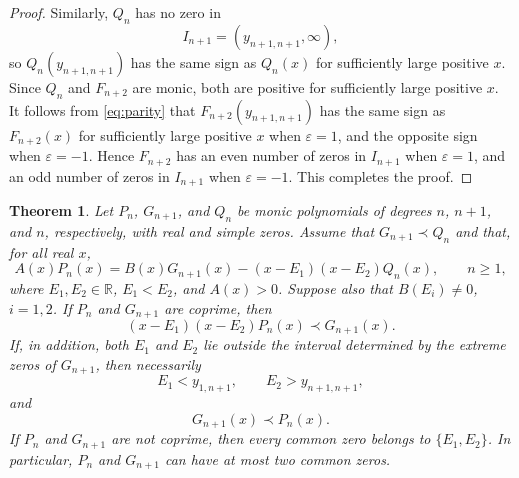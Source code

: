 \documentclass[final,3p,times,12pt]{elsarticle}
\newtheorem{theorem}{Theorem}[section]
\numberwithin{equation}{section}  %
\begin{document}
\begin{proof}
\medskip \noindent
Similarly, $Q_n$ has no zero in
\[
I_{n+1}=(y_{n+1,n+1},\infty),
\]
so $Q_n(y_{n+1,n+1})$ has the same sign as $Q_n(x)$ for sufficiently large positive $x$. Since $Q_n$ and $F_{n+2}$ are monic, both are positive for sufficiently large positive $x$. It follows from \eqref{eq:parity} that $F_{n+2}(y_{n+1,n+1})$ has the same sign as $F_{n+2}(x)$ for sufficiently large positive $x$ when $\varepsilon=1$, and the opposite sign when $\varepsilon=-1$. Hence $F_{n+2}$ has an even number of zeros in $I_{n+1}$ when $\varepsilon=1$, and an odd number of zeros in $I_{n+1}$ when $\varepsilon=-1$. This completes the proof.
\end{proof}





\begin{theorem}\label{MainTheorem3} Let $P_n$, $G_{n+1}$, and $Q_n$ be monic polynomials of degrees $n$, $n+1$, and $n$, respectively, with real and simple zeros. Assume that $G_{n+1}\prec Q_n$ and that, for all real $x$, \begin{equation} A(x)P_n(x) = B(x)G_{n+1}(x) - (x-E_1)(x-E_2)Q_n(x), \qquad n\geq1, \label{GeneralMixedTTRR3} \end{equation} where $E_1,E_2\in\mathbb{R}$, $E_1<E_2$, and $A(x)>0$. Suppose also that $B(E_i)\neq0$, $ i=1,2$. If $P_n$ and $G_{n+1}$ are coprime, then \[ (x-E_1)(x-E_2)P_n(x)\prec G_{n+1}(x). \] If, in addition, both $E_1$ and $E_2$ lie outside the interval determined by the extreme zeros of $G_{n+1}$, then necessarily \[ E_1<y_{1,n+1}, \qquad E_2>y_{n+1,n+1}, \] and \[ G_{n+1}(x)\prec P_n(x). \] If $P_n$ and $G_{n+1}$ are not coprime, then every common zero belongs to $\{E_1,E_2\}$. In particular, $P_n$ and $G_{n+1}$ can have at most two common zeros. \end{theorem} 
\end{document}
